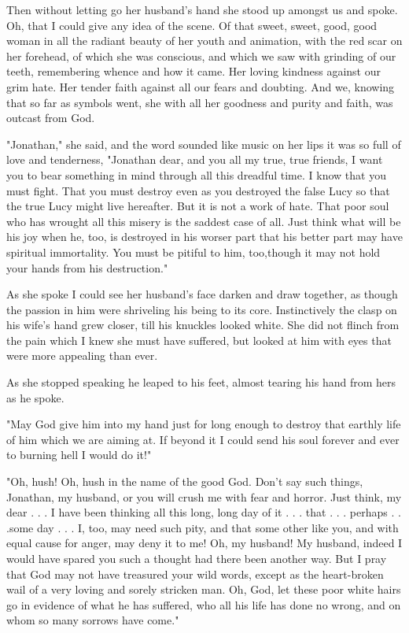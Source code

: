 Then without letting go her husband's hand she stood up amongst us and spoke. Oh, that I could give any idea of the scene. Of that sweet, sweet, good, good woman in all the radiant beauty of her youth and animation, with the red scar on her forehead, of which she was conscious, and which we saw with grinding of our teeth, remembering whence and how it came. Her loving kindness against our grim hate. Her tender faith against all our fears and doubting. And we, knowing that so far as symbols went, she with all her goodness and purity and faith, was outcast from God. 

"Jonathan," she said, and the word sounded like music on her lips it was so full of love and tenderness, "Jonathan dear, and you all my true, true friends, I want you to bear something in mind through all this dreadful time. I know that you must fight. That you must destroy even as you destroyed the false Lucy so that the true Lucy might live hereafter. But it is not a work of hate. That poor soul who has wrought all this misery is the saddest case of all. Just think what will be his joy when he, too, is destroyed in his worser part that his better part may have spiritual immortality. You must be pitiful to him, too,though it may not hold your hands from his destruction." 

As she spoke I could see her husband's face darken and draw together, as though the passion in him were shriveling his being to its core. Instinctively the clasp on his wife's hand grew closer, till his knuckles looked white. She did not flinch from the pain which I knew she must have suffered, but looked at him with eyes that were more appealing than ever. 

As she stopped speaking he leaped to his feet, almost tearing his hand from hers as he spoke. 

"May God give him into my hand just for long enough to destroy that earthly life of him which we are aiming at. If beyond it I could send his soul forever and ever to burning hell I would do it!" 

"Oh, hush! Oh, hush in the name of the good God. Don't say such things, Jonathan, my husband, or you will crush me with fear and horror. Just think, my dear . . . I have been thinking all this long, long day of it . . . that . . . perhaps . . .some day . . . I, too, may need such pity, and that some other like you, and with equal cause for anger, may deny it to me! Oh, my husband! My husband, indeed I would have spared you such a thought had there been another way. But I pray that God may not have treasured your wild words, except as the heart-broken wail of a very loving and sorely stricken man. Oh, God, let these poor white hairs go in evidence of what he has suffered, who all his life has done no wrong, and on whom so many sorrows have come." 

